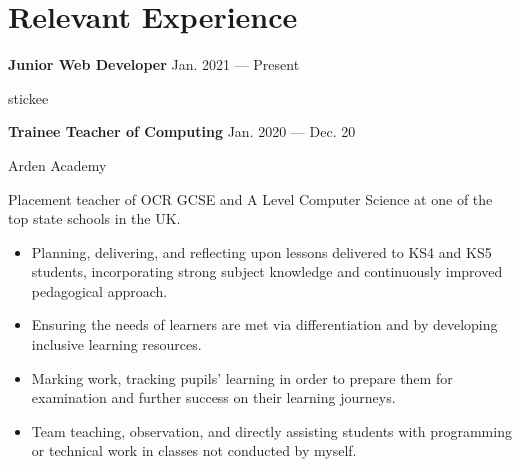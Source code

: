\section{Relevant Experience}

\parbox[t][][t]{\linewidth}{
    \parbox{\linewidth}{{\textbf{Junior Web Developer}}
        \hfill {{Jan. 2021 --- Present}}}
    \smallbreak
    
    \parbox{\linewidth}{stickee}
    \bigskip
}

\parbox[t][][t]{\linewidth}{
    \parbox{\linewidth}{{\textbf{Trainee Teacher of Computing}}
        \hfill {{Jan. 2020 --- Dec. 20}}}
    \smallbreak
    
    \parbox{\linewidth}{Arden Academy}
    
    \bigskip
    Placement teacher of OCR GCSE and A Level Computer Science at one of the top state schools in the UK.
    
    \bigskip
    \begin{itemize}
        \item{Planning, delivering, and reflecting upon lessons delivered to KS4 and KS5 students, incorporating strong subject knowledge and continuously improved pedagogical approach.}\\[-.6em]
        \item{Ensuring the needs of learners are met via differentiation and by developing inclusive learning resources.}\\[-.6em]
        \item{Marking work, tracking pupils' learning in order to prepare them for examination and further success on their learning journeys.}\\[-.6em]
        \item{Team teaching, observation, and directly assisting students with programming or technical work in classes not conducted by myself.}\\[-.6em]
    \end{itemize}
    \bigskip
}

